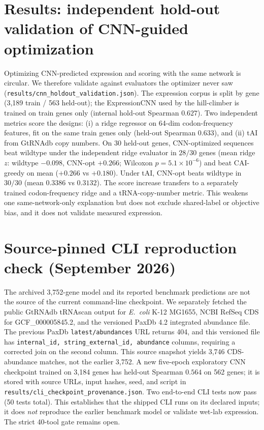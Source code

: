 \documentclass[11pt]{article}
\begin{document}
\section{Results: independent hold-out validation of CNN-guided optimization}
Optimizing CNN-predicted expression and scoring with the same network is circular. We therefore validate against evaluators the optimizer never saw (\texttt{results/cnn\_holdout\_validation.json}). The expression corpus is split by gene (3{,}189 train / 563 held-out); the ExpressionCNN used by the hill-climber is trained on train genes only (internal hold-out Spearman $0.627$). Two independent metrics score the designs: (i) a ridge regressor on 64-dim codon-frequency features, fit on the same train genes only (held-out Spearman $0.633$), and (ii) tAI from GtRNAdb copy numbers. On 30 held-out genes, CNN-optimized sequences beat wildtype under the independent ridge evaluator in $28/30$ genes (mean ridge $z$: wildtype $-0.098$, CNN-opt $+0.266$; Wilcoxon $p=5.1\times10^{-6}$) and beat CAI-greedy on mean ($+0.266$ vs $+0.180$). Under tAI, CNN-opt beats wildtype in $30/30$ (mean $0.3386$ vs $0.3132$). The score increase transfers to a separately trained codon-frequency ridge and a tRNA-copy-number metric. This weakens one same-network-only explanation but does not exclude shared-label or objective bias, and it does not validate measured expression.
\section{Source-pinned CLI reproduction check (September 2026)}
The archived 3,752-gene model and its reported benchmark predictions are not the source of the current command-line checkpoint. We separately fetched the public GtRNAdb tRNAscan output for \emph{E.~coli} K-12 MG1655, NCBI RefSeq CDS for GCF\_000005845.2, and the versioned PaxDb 4.2 integrated abundance file. The previous PaxDb \texttt{latest/abundances} URL returns 404, and this versioned file has \texttt{internal\_id, string\_external\_id, abundance} columns, requiring a corrected join on the second column. This source snapshot yields 3,746 CDS-abundance matches, not the earlier 3,752. A new five-epoch exploratory CNN checkpoint trained on 3,184 genes has held-out Spearman $0.564$ on 562 genes; it is stored with source URLs, input hashes, seed, and script in \texttt{results/cli\_checkpoint\_provenance.json}. Two end-to-end CLI tests now pass (50 tests total). This establishes that the shipped CLI runs on its declared inputs; it does \emph{not} reproduce the earlier benchmark model or validate wet-lab expression. The strict 40-tool gate remains open.
\end{document}
